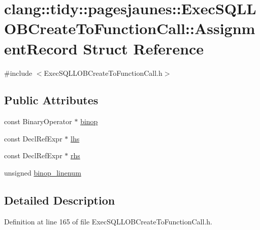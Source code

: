 \hypertarget{structclang_1_1tidy_1_1pagesjaunes_1_1_exec_s_q_l_l_o_b_create_to_function_call_1_1_assignment_record}{}\section{clang\+:\+:tidy\+:\+:pagesjaunes\+:\+:Exec\+S\+Q\+L\+L\+O\+B\+Create\+To\+Function\+Call\+:\+:Assignment\+Record Struct Reference}
\label{structclang_1_1tidy_1_1pagesjaunes_1_1_exec_s_q_l_l_o_b_create_to_function_call_1_1_assignment_record}


{\ttfamily \#include $<$Exec\+S\+Q\+L\+L\+O\+B\+Create\+To\+Function\+Call.\+h$>$}

\subsection*{Public Attributes}
\begin{DoxyCompactItemize}
\item 
const Binary\+Operator $\ast$ \hyperlink{structclang_1_1tidy_1_1pagesjaunes_1_1_exec_s_q_l_l_o_b_create_to_function_call_1_1_assignment_record_a5a2a288bba20c7c91cb170fc930b5309}{binop}
\item 
const Decl\+Ref\+Expr $\ast$ \hyperlink{structclang_1_1tidy_1_1pagesjaunes_1_1_exec_s_q_l_l_o_b_create_to_function_call_1_1_assignment_record_adb0ce84ed30190742bf8b2ace9d05e1c}{lhs}
\item 
const Decl\+Ref\+Expr $\ast$ \hyperlink{structclang_1_1tidy_1_1pagesjaunes_1_1_exec_s_q_l_l_o_b_create_to_function_call_1_1_assignment_record_ad34a2131a0984a83dcbb6816dc001d2b}{rhs}
\item 
unsigned \hyperlink{structclang_1_1tidy_1_1pagesjaunes_1_1_exec_s_q_l_l_o_b_create_to_function_call_1_1_assignment_record_af5b8b52f9dd1f757d0c502ed3accf4b8}{binop\+\_\+linenum}
\end{DoxyCompactItemize}


\subsection{Detailed Description}


Definition at line 165 of file Exec\+S\+Q\+L\+L\+O\+B\+Create\+To\+Function\+Call.\+h.



